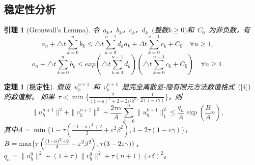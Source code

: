\documentclass[twoside,UTF8]{nputhesis}
\begin{document}
\subsection{稳定性分析}
\newtheorem{theorem}{\hspace{2em}定理}[chapter]
\newtheorem{lemma}{\hspace{2em}引理}[chapter]
\begin{lemma}[Gronwall's Lemma\cite{He2003}]
	令~$a_k$，$b_k$，$c_k$，$d_k$~$($整数$k\geq0$$)$和~$C_0$~为非负数，有
	\begin{equation*}
	a_n+\triangle t\sum^n_{k=0}b_k\leq\triangle t\sum^{n-1}_{k=0}d_ka_k+\Delta t\sum^{n-1}_{k=0}c_k+C_0   \quad \forall n\geq1,
	\label{5}
	\end{equation*}
	\begin{equation*}
	a_n+\triangle t\sum^n_{k=0}b_k\leq exp\left(\triangle t\sum^{n-1}_{k=0}d_k\right)\left( \triangle t\sum^{n-1}_{k=0}c_k+C_0\right)  \quad \forall n\geq1.
	\label{6}
	\end{equation*}
	\label{yinli1}
\end{lemma}
\begin{theorem}[稳定性]
	假设~$u^{n+1}_h$~和~$v^{n+1}_h$~是完全离散显-隐有限元方法数值格式~$(\ref{4})$的数值解。 如果~$\tau<\min\{\frac{2}{(1-a)^2+2+2\varepsilon^2\beta^2},\frac{1}{2(1-\varepsilon\gamma)}\}$，则
	\begin{equation*}
	\parallel u^{n+1}_h\parallel^2+\parallel v^{n+1}_h\parallel^2+\frac{2\tau\alpha}{A}\sum^n_{k=0}\parallel u^{k+1}_h\parallel^2_1\leq \frac{q_n}{A}\exp(\frac{B}{A}n),
	\end{equation*}
	\label{the:the1}
	其中$A=\min\{1-\tau\left(\frac{(1-a)^2+2}{2}+\varepsilon^2\beta^2\right),1-2\tau(1-\varepsilon\gamma)\}$，$B=\max\{\tau\left(\frac{(1-a)^2+2}{2}+\varepsilon^2\beta^2\right),\tau\\(3-2\varepsilon\gamma)\}$，$q_n=\parallel u^0_h\parallel^2+(1+\tau)\parallel v^0_h\parallel^2+\tau(n+1)(\varepsilon\delta)^2$。
	\label{the:the1}
\end{theorem}
\end{document}
